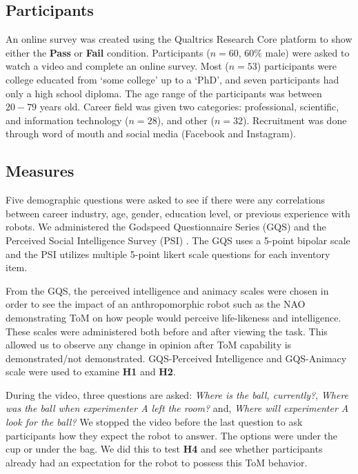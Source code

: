 \documentclass[letterpaper, 10 pt, conference]{ieeeconf}  %
\begin{document}
\subsection{Participants}

An online survey was created using the Qualtrics Research Core platform \cite{Qualtrics} to show either the {\bf Pass} or {\bf Fail} condition. Participants ($n = 60$, $60\%$ male) were asked to watch a video and complete an online survey. Most ($n = 53$) participants were college educated from `some college' up to a `PhD', and seven participants had only a high school diploma. The age range of the participants was between $20-79$ years old. Career field was given two categories: professional, scientific, and information technology ($n= 28$), and other ($n=32$). Recruitment was done through word of mouth and social media (Facebook and Instagram).  

\subsection{Measures}
Five demographic questions were asked to see if there were any correlations between career industry, age, gender, education level, or previous experience with robots. We administered the Godspeed Questionnaire Series (GQS) \cite{BARTNECK} and the Perceived Social Intelligence Survey (PSI) \cite{PSI}. The GQS uses a 5-point bipolar scale and the PSI utilizes multiple 5-point likert scale questions for each inventory item.

From the GQS, the perceived intelligence and animacy scales were chosen in order to see the impact of an anthropomorphic robot such as the NAO demonstrating ToM on how people would perceive life-likeness and intelligence. These scales were administered both before and after viewing the task. This allowed us to observe any change in opinion after ToM capability is demonstrated/not demonstrated.  GQS-Perceived Intelligence and GQS-Animacy scale were used to examine \textbf{H1} and \textbf{H2}.

During the video, three questions are asked: {\em Where is the ball, currently?}, {\em Where was the ball when experimenter A left the room?} and, {\em Where will experimenter A look for the ball?} We stopped the video before the last question to ask participants how they expect the robot to answer. The options were under the cup or under the bag. We did this to test \textbf{H4} and see whether participants already had an expectation for the robot to possess this ToM behavior.
\end{document}

